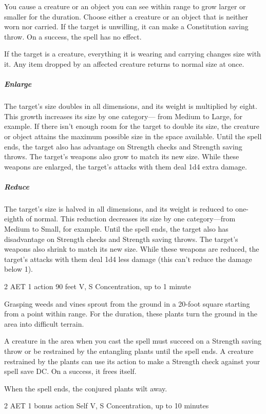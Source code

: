 You cause a creature or an object you can see within range to grow larger or smaller for the duration. Choose either a creature or an object that is neither worn nor carried. If the target is unwilling, it can make a Constitution saving throw. On a success, the spell has no effect.

If the target is a creature, everything it is wearing and carrying changes size with it. Any item dropped by an affected creature returns to normal size at once.

\subparagraph*{Enlarge} The target's size doubles in all dimensions, and its weight is multiplied by eight. This growth increases its size by one category— from Medium to Large, for example. If there isn't enough room for the target to double its size, the creature or object attains the maximum possible size in the space available. Until the spell ends, the target also has advantage on Strength checks and Strength saving throws. The target's weapons also grow to match its new size. While these weapons are enlarged, the target's attacks with them deal 1d4 extra damage.

\subparagraph*{Reduce} The target's size is halved in all dimensions, and its weight is reduced to one-eighth of normal. This reduction decreases its size by one category—from Medium to Small, for example. Until the spell ends, the target also has disadvantage on Strength checks and Strength saving throws. The target's weapons also shrink to match its new size. While these weapons are reduced, the target's attacks with them deal 1d4 less damage (this can't reduce the damage below 1).


{2 AET}
{1 action}
{90 feet}
{V, S}
{Concentration, up to 1 minute}

Grasping weeds and vines sprout from the ground in a 20-foot square starting from a point within range. For the duration, these plants turn the ground in the area into difficult terrain.

A creature in the area when you cast the spell must succeed on a Strength saving throw or be restrained by the entangling plants until the spell ends. A creature restrained by the plants can use its action to make a Strength check against your spell save DC. On a success, it frees itself.

When the spell ends, the conjured plants wilt away.


{2 AET}
{1 bonus action}
{Self}
{V, S}
{Concentration, up to 10 minutes}

